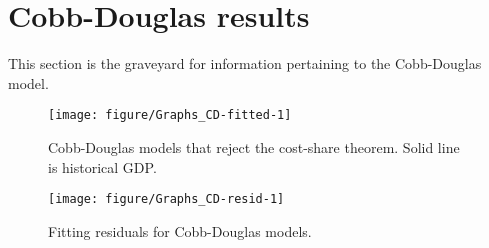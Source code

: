 \documentclass[preprint,authoryear,12pt]{elsarticle}\usepackage[]{graphicx}\usepackage[]{color}
\makeatletter
\def\maxwidth{ %
  \ifdim\Gin@nat@width>\linewidth
    \linewidth
  \else
    \Gin@nat@width
  \fi
}
\newenvironment{knitrout}{}{} %
\makeatother
\begin{document}
\section{Cobb-Douglas results} 
\label{sec:cd_results}

This section is the graveyard for information pertaining to the Cobb-Douglas model.

%
\begin{knitrout}
\color{fgcolor}\begin{figure}[H]

{\centering \texttt{[image: figure/Graphs\_CD-fitted-1]} 

}

\caption[Cobb-Douglas models that reject the cost-share theorem]{Cobb-Douglas models that reject the cost-share theorem. Solid line is historical GDP.}\label{fig:Graphs CD-fitted}
\end{figure}


\end{knitrout}

%
\begin{knitrout}
\color{fgcolor}\begin{figure}[H]

{\centering \texttt{[image: figure/Graphs\_CD-resid-1]} 

}

\caption[Fitting residuals for Cobb-Douglas models]{Fitting residuals for Cobb-Douglas models.}\label{fig:Graphs CD-resid}
\end{figure}


\end{knitrout}
\end{document}
